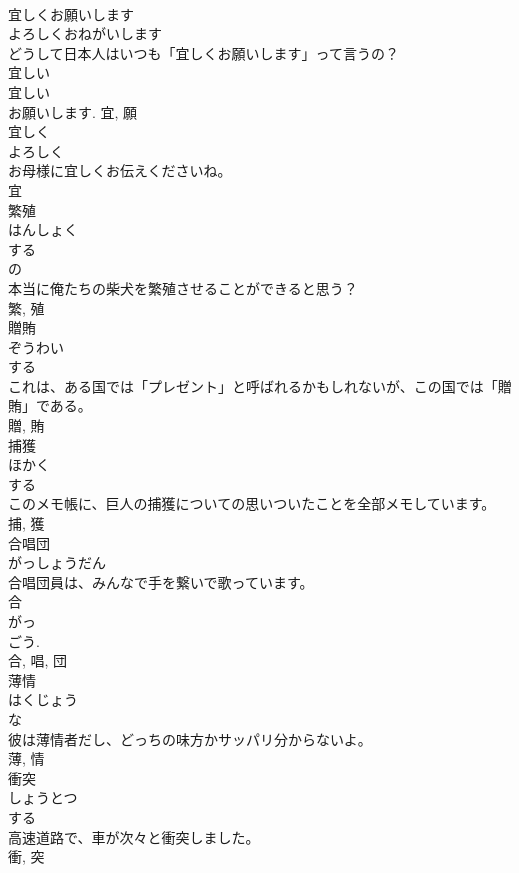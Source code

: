 \documentclass[8pt]{extreport}
\begin{document}
\begin{CJK}{UTF8}{min}
\\	宜しくお願いします	
\\	よろしくおねがいします	
\\	どうして日本人はいつも「宜しくお願いします」って言うの？	
\\	宜しい 
\\	宜しい 
\\	お願いします.	宜, 願	
\\	宜しく	
\\	よろしく	
\\	お母様に宜しくお伝えくださいね。	
\\	宜	
\\	繁殖	
\\	はんしょく	
\\	する 
\\	の 
\\	本当に俺たちの柴犬を繁殖させることができると思う？	
\\	繁, 殖	
\\	贈賄	
\\	ぞうわい	
\\	する 
\\	これは、ある国では「プレゼント」と呼ばれるかもしれないが、この国では「贈賄」である。	
\\	贈, 賄	
\\	捕獲	
\\	ほかく	
\\	する 
\\	このメモ帳に、巨人の捕獲についての思いついたことを全部メモしています。	
\\	捕, 獲	
\\	合唱団	
\\	がっしょうだん	
\\	合唱団員は、みんなで手を繋いで歌っています。	
\\	合 
\\	がっ 
\\	ごう. 
\\	合, 唱, 団	
\\	薄情	
\\	はくじょう	
\\	な 
\\	彼は薄情者だし、どっちの味方かサッパリ分からないよ。	
\\	薄, 情	
\\	衝突	
\\	しょうとつ	
\\	する 
\\	高速道路で、車が次々と衝突しました。	
\\	衝, 突	

\end{CJK}
\end{document}
